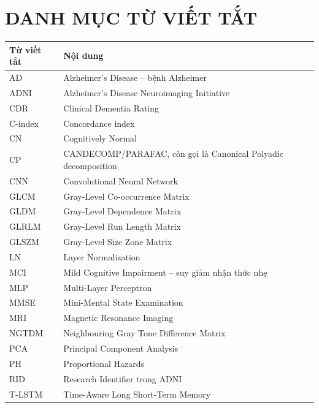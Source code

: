 \chapter*{DANH MỤC TỪ VIẾT TẮT}

\begin{longtable}{L{3.2cm}L{10.5cm}}
\toprule
Từ viết tắt & Nội dung \\
\midrule
AD & Alzheimer's Disease -- bệnh Alzheimer \\
ADNI & Alzheimer's Disease Neuroimaging Initiative \\
CDR & Clinical Dementia Rating \\
C-index & Concordance index \\
CN & Cognitively Normal \\
CP & CANDECOMP/PARAFAC, còn gọi là Canonical Polyadic decomposition \\
CNN & Convolutional Neural Network \\
GLCM & Gray-Level Co-occurrence Matrix \\
GLDM & Gray-Level Dependence Matrix \\
GLRLM & Gray-Level Run Length Matrix \\
GLSZM & Gray-Level Size Zone Matrix \\
LN & Layer Normalization \\
MCI & Mild Cognitive Impairment -- suy giảm nhận thức nhẹ \\
MLP & Multi-Layer Perceptron \\
MMSE & Mini-Mental State Examination \\
MRI & Magnetic Resonance Imaging \\
NGTDM & Neighbouring Gray Tone Difference Matrix \\
PCA & Principal Component Analysis \\
PH & Proportional Hazards \\
RID & Research Identifier trong ADNI \\
T-LSTM & Time-Aware Long Short-Term Memory \\
\bottomrule
\end{longtable}
